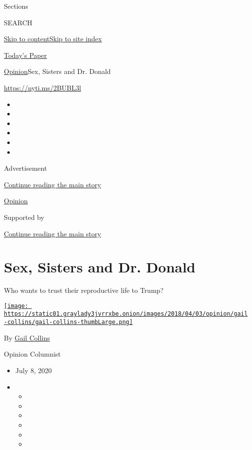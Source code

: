 Sections

SEARCH

\protect\hyperlink{site-content}{Skip to
content}\protect\hyperlink{site-index}{Skip to site index}

\href{https://myaccount.nytimes3xbfgragh.onion/auth/login?response_type=cookie\&client_id=vi}{}

\href{https://www.nytimes3xbfgragh.onion/section/todayspaper}{Today's
Paper}

\href{/section/opinion}{Opinion}\textbar{}Sex, Sisters and Dr. Donald

\href{https://nyti.ms/2BUBL3l}{https://nyti.ms/2BUBL3l}

\begin{itemize}
\item
\item
\item
\item
\item
\item
\end{itemize}

Advertisement

\protect\hyperlink{after-top}{Continue reading the main story}

\href{/section/opinion}{Opinion}

Supported by

\protect\hyperlink{after-sponsor}{Continue reading the main story}

\hypertarget{sex-sisters-and-dr-donald}{%
\section{Sex, Sisters and Dr. Donald}\label{sex-sisters-and-dr-donald}}

Who wants to trust their reproductive life to Trump?

\href{https://www.nytimes3xbfgragh.onion/by/gail-collins}{\texttt{[image: https://static01.graylady3jvrrxbe.onion/images/2018/04/03/opinion/gail-collins/gail-collins-thumbLarge.png]}}

By \href{https://www.nytimes3xbfgragh.onion/by/gail-collins}{Gail
Collins}

Opinion Columnist

\begin{itemize}
\item
  July 8, 2020
\item
  \begin{itemize}
  \item
  \item
  \item
  \item
  \item
  \item
  \end{itemize}
\end{itemize}

